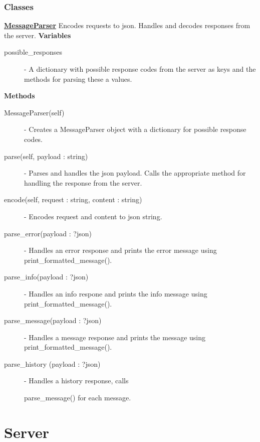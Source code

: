\documentclass[a4paper, 12pt]{article}
\begin{document}
        \subsubsection{Classes}
            \textbf{\underline{MessageParser}}
            \newline
            \newline
                Encodes requests to json. Handles and decodes responses from the server.
                \newline
                \newline
                \textbf{Variables}
                    \begin{description}
                        \item[possible\_responses] - A dictionary with possible response codes from the server as keys and the methods for parsing these a values.
                    \end{description}
                \textbf{Methods}
                    \begin{description}
                        \item[MessageParser(self)] - Creates a MessageParser object with a dictionary for possible response codes.
                        \item[parse(self, payload : string)] - Parses and handles the json payload. Calls the appropriate method for handling the response from the server.
                        \item[encode(self, request : string, content : string)] - Encodes request and content to json string.
                        \item[parse\_error(payload : ?json)] - Handles an error response and prints the error message using print\_formatted\_message().
                        \item[parse\_info(payload : ?json)] - Handles an info respone and prints the info message using print\_formatted\_message().
                        \item[parse\_message(payload : ?json)] - Handles a message response and prints the message using print\_formatted\_message().
                        \item[parse\_history (payload : ?json)] - Handles a history response, calls

                        parse\_message() for each message.
                    \end{description}
\section{Server}
\end{document}

